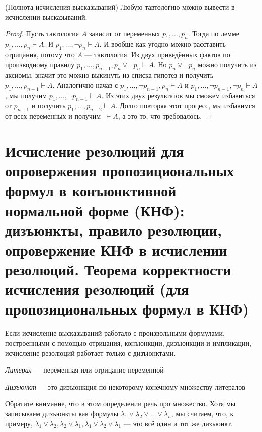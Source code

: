 \documentclass{article}
\begin{document}
\begin{theorem}{(Полнота исчисления высказываний)}
	Любую тавтологию можно вывести в исчислении высказываний.
\end{theorem}

\begin{proof}
	Пусть тавтология $A$ зависит от переменных $p_1, \ldots, p_n$. Тогда по лемме $p_1, \ldots, p_n \vdash A$. И $p_1, \ldots, \lnot p_n \vdash A$. И вообще как угодно можно расставить отрицания, потому что $A$ --- тавтология. Из двух приведённых фактов по производному правилу $p_1, \ldots, p_{n - 1}, p_n \lor \lnot p_n \vdash A$. Но $p_n \lor \lnot p_n$ можно получить из аксиомы, значит это можно выкинуть из списка гипотез и получить $p_1, \ldots, p_{n - 1} \vdash A$. Аналогично начав с $p_1, \ldots, \lnot p_{n - 1}, p_n \vdash A$ и $p_1, \ldots, \lnot p_{n - 1}, \lnot p_n \vdash A$, мы получим $p_1, \ldots, \lnot p_{n - 1} \vdash A$. Из этих двух результатов мы сможем избавиться от $p_{n - 1}$ и получить $p_1, \ldots, p_{n - 2} \vdash A$. Долго повторяя этот процесс, мы избавимся от всех переменных и получим $\ \vdash A$, а это то, что требовалось.
\end{proof}

\section{Исчисление резолюций для опровержения пропозициональных формул в конъюнктивной нормальной форме (КНФ): дизъюнкты, правило резолюции, опровержение КНФ в исчислении резолюций. Теорема корректности исчисления резолюций (для пропозициональных формул в КНФ)}
Если исчисление высказываний работало с произвольными формулами, построенными с помощью отрицания, конъюнкции, дизъюнкции и импликации, исчисление резолюций работает только с дизъюнктами.

\begin{definition} \textit{Литерал} --- переменная или отрицание переменной \end{definition}
\begin{definition} \textit{Дизъюнкт} --- это дизъюнкция по некоторому конечному множеству литералов \end{definition}

Обратите внимание, что в этом определении речь про множество. Хотя мы записываем дизъюнкты как формулы $\lambda_1 \lor \lambda_2 \lor \ldots \lor \lambda_n$, мы считаем, что, к примеру, $\lambda_1 \lor \lambda_2, \lambda_2 \lor \lambda_1, \lambda_1 \lor \lambda_2 \lor \lambda_1$ --- это всё один и тот же дизъюнкт.
\end{document}
